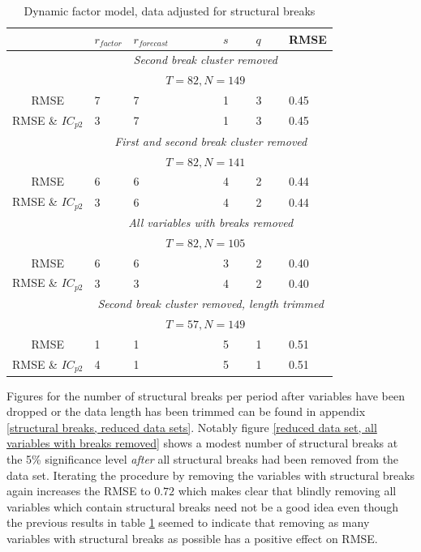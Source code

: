 \documentclass[12pt]{article}
\begin{document}
\begin{table}[ht]
	\centering
	\begin{tabular}{c|lllll}
		   & $r_{factor}$ & $r_{forecast}$ & $s$ & $q$ & RMSE \\
		 \hline
		 \hline
		    & & \multicolumn{3}{c}{\textit{Second break cluster removed}} \\
			& & \multicolumn{3}{c}{$T=82, N=149$} \\
		  \hline
		   	RMSE & 7 & 7 & 1 & 3 & 0.45 \\
		   	RMSE \& $IC_{p2}$ & 3 & 7 & 1 & 3 & 0.45 \\
		  \hline
		  \hline
		  & \multicolumn{5}{c}{\textit{First and second break cluster removed}} \\ 
			& & \multicolumn{3}{c}{$T=82, N=141$} \\
		  \hline
		   	RMSE & 6 & 6 & 4 & 2 & 0.44 \\
		   	RMSE \& $IC_{p2}$ & 3 & 6 & 4 & 2 & 0.44 \\
		  \hline
		  \hline
	  	  & \multicolumn{5}{c}{\textit{All variables with breaks removed}} \\ 
			& & \multicolumn{3}{c}{$T=82, N=105$} \\
          \hline
		   	RMSE & 6 & 6 & 3 & 2 & 0.40 \\
		   	RMSE \& $IC_{p2}$ & 3 & 3 & 4 & 2 & 0.40 \\
		  \hline
		  \hline
		  & \multicolumn{5}{c}{\textit{Second break cluster removed, length trimmed}} \\
			& & \multicolumn{3}{c}{$T=57, N=149$} \\
		  \hline
		   	RMSE & 1 & 1 & 5 & 1 & 0.51 \\
		   	RMSE \& $IC_{p2}$ & 4 & 1 & 5 & 1 & 0.51 \\
		  \hline
		  \hline		  
	\end{tabular}
	\caption{Dynamic factor model, data adjusted for structural breaks}
	\label{results dynamic factor model, reduced data sets}
\end{table}


Figures for the number of structural breaks per period after variables have been dropped or the data length has been trimmed can be found in appendix \ref{structural breaks, reduced data sets}. Notably figure \ref{reduced data set, all variables with breaks removed} shows a modest number of structural breaks at the 5\% significance level \textit{after} all structural breaks had been removed from the data set. Iterating the procedure by removing the variables with structural breaks again increases the RMSE to $0.72$ which makes clear that blindly removing all variables which contain structural breaks need not be a good idea even though the previous results in table \ref{results dynamic factor model, reduced data sets} seemed to indicate that removing as many variables with structural breaks as possible has a positive effect on RMSE.
\end{document}
